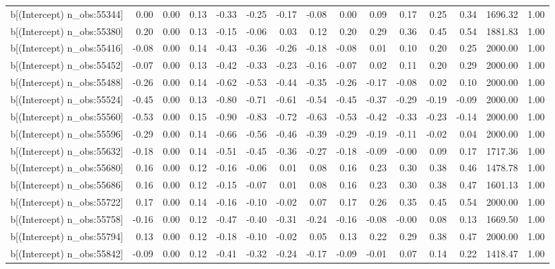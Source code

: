 \begin{table}[ht]
\begin{tabular}{rrrrrrrrrrrrrrr}
  b[(Intercept) n\_obs:55344] & 0.00 & 0.00 & 0.13 & -0.33 & -0.25 & -0.17 & -0.08 & 0.00 & 0.09 & 0.17 & 0.25 & 0.34 & 1696.32 & 1.00 \\ 
  b[(Intercept) n\_obs:55380] & 0.20 & 0.00 & 0.13 & -0.15 & -0.06 & 0.03 & 0.12 & 0.20 & 0.29 & 0.36 & 0.45 & 0.54 & 1881.83 & 1.00 \\ 
  b[(Intercept) n\_obs:55416] & -0.08 & 0.00 & 0.14 & -0.43 & -0.36 & -0.26 & -0.18 & -0.08 & 0.01 & 0.10 & 0.20 & 0.25 & 2000.00 & 1.00 \\ 
  b[(Intercept) n\_obs:55452] & -0.07 & 0.00 & 0.13 & -0.42 & -0.33 & -0.23 & -0.16 & -0.07 & 0.02 & 0.11 & 0.20 & 0.29 & 2000.00 & 1.00 \\ 
  b[(Intercept) n\_obs:55488] & -0.26 & 0.00 & 0.14 & -0.62 & -0.53 & -0.44 & -0.35 & -0.26 & -0.17 & -0.08 & 0.02 & 0.10 & 2000.00 & 1.00 \\ 
  b[(Intercept) n\_obs:55524] & -0.45 & 0.00 & 0.13 & -0.80 & -0.71 & -0.61 & -0.54 & -0.45 & -0.37 & -0.29 & -0.19 & -0.09 & 2000.00 & 1.00 \\ 
  b[(Intercept) n\_obs:55560] & -0.53 & 0.00 & 0.15 & -0.90 & -0.83 & -0.72 & -0.63 & -0.53 & -0.42 & -0.33 & -0.23 & -0.14 & 2000.00 & 1.00 \\ 
  b[(Intercept) n\_obs:55596] & -0.29 & 0.00 & 0.14 & -0.66 & -0.56 & -0.46 & -0.39 & -0.29 & -0.19 & -0.11 & -0.02 & 0.04 & 2000.00 & 1.00 \\ 
  b[(Intercept) n\_obs:55632] & -0.18 & 0.00 & 0.14 & -0.51 & -0.45 & -0.36 & -0.27 & -0.18 & -0.09 & -0.00 & 0.09 & 0.17 & 1717.36 & 1.00 \\ 
  b[(Intercept) n\_obs:55680] & 0.16 & 0.00 & 0.12 & -0.16 & -0.06 & 0.01 & 0.08 & 0.16 & 0.23 & 0.30 & 0.38 & 0.46 & 1478.78 & 1.00 \\ 
  b[(Intercept) n\_obs:55686] & 0.16 & 0.00 & 0.12 & -0.15 & -0.07 & 0.01 & 0.08 & 0.16 & 0.23 & 0.30 & 0.38 & 0.47 & 1601.13 & 1.00 \\ 
  b[(Intercept) n\_obs:55722] & 0.17 & 0.00 & 0.14 & -0.16 & -0.10 & -0.02 & 0.07 & 0.17 & 0.26 & 0.35 & 0.45 & 0.54 & 2000.00 & 1.00 \\ 
  b[(Intercept) n\_obs:55758] & -0.16 & 0.00 & 0.12 & -0.47 & -0.40 & -0.31 & -0.24 & -0.16 & -0.08 & -0.00 & 0.08 & 0.13 & 1669.50 & 1.00 \\ 
  b[(Intercept) n\_obs:55794] & 0.13 & 0.00 & 0.12 & -0.18 & -0.10 & -0.02 & 0.05 & 0.13 & 0.22 & 0.29 & 0.38 & 0.47 & 2000.00 & 1.00 \\ 
  b[(Intercept) n\_obs:55842] & -0.09 & 0.00 & 0.12 & -0.41 & -0.32 & -0.24 & -0.17 & -0.09 & -0.01 & 0.07 & 0.14 & 0.22 & 1418.47 & 1.00 \\ 

\end{tabular}
\end{table}
